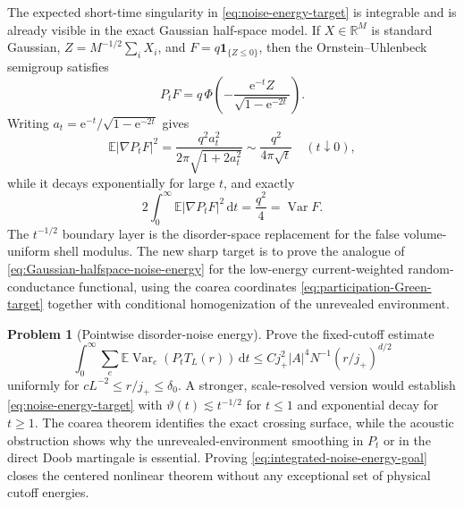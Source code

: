 \documentclass[11pt]{article}
\theoremstyle{definition}
\newtheorem{problem}[theorem]{Problem}
\theoremstyle{remark}
\newcommand{\e}{\mathrm e}
\newcommand{\R}{\mathbb R}
\newcommand{\E}{\mathbb E}
\newcommand{\Var}{\operatorname{Var}}
\newcommand{\abs}[1]{\left\lvert #1\right\rvert}
\newcommand{\dd}{\,\mathrm d}
\begin{document}
The expected short-time singularity in \eqref{eq:noise-energy-target} is
integrable and is already visible in the exact Gaussian half-space model.  If
$X\in\R^M$ is standard Gaussian,
$Z=M^{-1/2}\sum_iX_i$, and $F=q\bm1_{\{Z\le0\}}$, then the
Ornstein--Uhlenbeck semigroup satisfies
\begin{equation}
 P_tF=q\,\Phi\left(
 -\frac{\e^{-t}Z}{\sqrt{1-\e^{-2t}}}\right).
 \label{eq:Gaussian-halfspace-semigroup}
\end{equation}
Writing $a_t=\e^{-t}/\sqrt{1-\e^{-2t}}$ gives
\begin{equation}
 \E\abs{\nabla P_tF}^2
 =\frac{q^2a_t^2}{2\pi\sqrt{1+2a_t^2}}
 \sim\frac{q^2}{4\pi\sqrt t}
 \quad(t\downarrow0),
 \label{eq:Gaussian-halfspace-noise-energy}
\end{equation}
while it decays exponentially for large $t$, and exactly
\begin{equation}
 2\int_0^\infty\E\abs{\nabla P_tF}^2\dd t
 =\frac{q^2}{4}=\Var F.
 \label{eq:Gaussian-halfspace-variance-closure}
\end{equation}
The $t^{-1/2}$ boundary layer is the disorder-space replacement for the false
volume-uniform shell modulus.  The new sharp target is to prove the analogue
of \eqref{eq:Gaussian-halfspace-noise-energy} for the low-energy
current-weighted random-conductance functional, using the coarea coordinates
\eqref{eq:participation-Green-target} together with conditional homogenization
of the unrevealed environment.


\begin{problem}[Pointwise disorder-noise energy]
\label{prob:pointwise-disorder-noise-energy}
Prove the fixed-cutoff estimate
\begin{equation}
 \int_0^\infty\sum_e\E\Var_e(P_tT_L(r))\dd t
 \le Cj_+^2\abs A^4N^{-1}(r/j_+)^{d/2}
 \label{eq:integrated-noise-energy-goal}
\end{equation}
uniformly for $cL^{-2}\le r/j_+\le\delta_0$.  A stronger, scale-resolved
version would establish \eqref{eq:noise-energy-target} with
$\vartheta(t)\lesssim t^{-1/2}$ for $t\le1$ and exponential decay for
$t\ge1$.  The coarea theorem identifies the exact crossing surface, while the
acoustic obstruction shows why the unrevealed-environment smoothing in $P_t$
or in the direct Doob martingale is essential.  Proving
\eqref{eq:integrated-noise-energy-goal} closes the centered nonlinear theorem
without any exceptional set of physical cutoff energies.
\end{problem}
\end{document}

